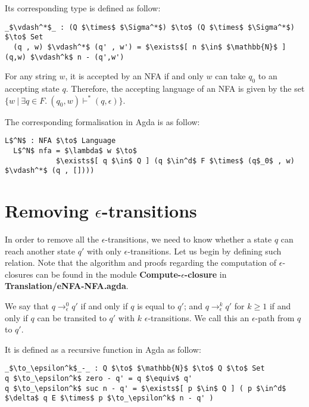 \par Its corresponding type is defined as follow: 
\begin{lstlisting}[mathescape=true,xleftmargin=.3\textwidth]
  _$\vdash^*$_ : (Q $\times$ $\Sigma^*$) $\to$ (Q $\times$ $\Sigma^*$) $\to$ Set
  (q , w) $\vdash^*$ (q' , w') = $\exists$[ n $\in$ $\mathbb{N}$ ] (q,w) $\vdash^k$ n - (q',w')
\end{lstlisting}

\begin{defn}
\noindent For any string \(w\), it is accepted by an NFA
if and only \(w\) can take \(q_0\) to an accepting state \(q\). Therefore, the
accepting language of an NFA is given by the set \(\{w\ |\ \exists q\in F.\ (q_0,w) \vdash^* (q,\epsilon)\}\). 
\end{defn}

\par The corresponding formalisation in Agda is as follow: 
\begin{lstlisting}[mathescape=true,xleftmargin=.3\textwidth]
  L$^N$ : NFA $\to$ Language
  L$^N$ nfa = $\lambda$ w $\to$ 
            $\exists$[ q $\in$ Q ] (q $\in^d$ F $\times$ (q$_0$ , w) $\vdash^*$ (q , [])))
\end{lstlisting} 


\section{Removing \(\epsilon\)-transitions}
\par In order to remove all the \(\epsilon\)-transitions, we need to
know whether a state \(q\) can reach another state \(q'\) with only
\(\epsilon\)-transitions. Let us begin by defining such relation. Note that the algorithm and proofs regarding the
computation of \(\epsilon\)-closures can be found in the module
\textbf{Compute-\(\epsilon\)-closure} in
\textbf{Translation/eNFA-NFA.agda}. 

\begin{defn}
\noindent We say that
\(q \to_\epsilon^0 q'\) if and only if
\(q\) is equal to \(q'\); and \(q \to_\epsilon^k q'\) for \(k \geq
1\) if and only if \(q\) can be transited to \(q'\) with \(k\)
\(\epsilon\)-transitions. We call this an \(\epsilon\)-path from \(q\) to \(q'\).
\end{defn}

\par It is defined as a recursive function in Agda as follow:
\begin{lstlisting}[mathescape=true,xleftmargin=.3\textwidth]
_$\to_\epsilon^k$_-_ : Q $\to$ $\mathbb{N}$ $\to$ Q $\to$ Set
q $\to_\epsilon^k$ zero - q' = q $\equiv$ q'
q $\to_\epsilon^k$ suc n - q' = $\exists$[ p $\in$ Q ] ( p $\in^d$ $\delta$ q E $\times$ p $\to_\epsilon^k$ n - q' )
\end{lstlisting}

